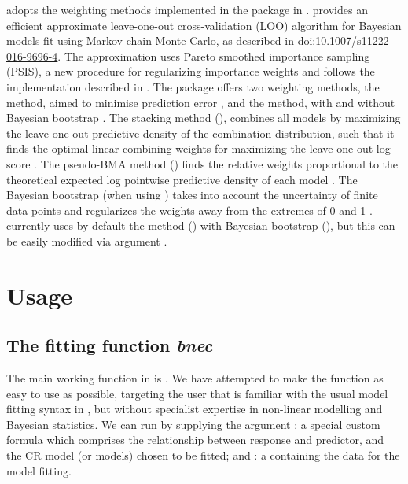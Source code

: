 \documentclass[
  shortnames]{jss}
\begin{document}
 adopts the weighting methods implemented in the  \citep{vehtari2020} package in .  provides an efficient approximate leave-one-out cross-validation (LOO) algorithm for Bayesian models fit using Markov chain Monte Carlo, as described in \citep{vehtari2017} \url{doi:10.1007/s11222-016-9696-4}. The approximation uses Pareto smoothed importance sampling (PSIS), a new procedure for regularizing importance weights and follows the implementation described in \citep{Vehtari2019}. The  package offers two weighting methods, the  method, aimed to minimise prediction error \citep{Yao2018}, and the  method, with and without Bayesian bootstrap \citep{vehtari2020, vehtari2017}. The stacking method (), combines all models by maximizing the leave-one-out predictive density of the combination distribution, such that it finds the optimal linear combining weights for maximizing the leave-one-out log score \citep{vehtari2020}. The pseudo-BMA method () finds the relative weights proportional to the theoretical expected log pointwise predictive density of each model \citep{vehtari2020}. The Bayesian bootstrap (when using ) takes into account the uncertainty of finite data points and regularizes the weights away from the extremes of 0 and 1 \citep{vehtari2020}.  currently uses by default the  method () with Bayesian bootstrap (), but this can be easily modified via argument .

\hypertarget{usage}{%
\section{Usage}\label{usage}}

\subsection[The fitting function bnec]{The fitting function \emph{bnec}}\label{ffbnec}

The main working function in  is . We have attempted to make the  function as easy to use as possible, targeting the  user that is familiar with the usual model fitting syntax in , but without specialist expertise in non-linear modelling and Bayesian statistics. We can run  by supplying the argument : a special custom formula which comprises the relationship between response and predictor, and the CR model (or models) chosen to be fitted; and : a  containing the data for the model fitting.
\end{document}
